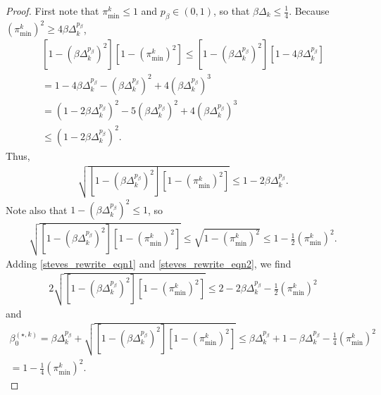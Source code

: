 \documentclass{article}
\theoremstyle{case}
\numberwithin{theorem}{subsection}
\newcommand{\bsk}{{\beta_0^{(\star, k)}}}
\newcommand{\dk}{\Delta_k}
\newcommand{\thetamink}{{\pi^k_{\textrm{min}}}}
\begin{document}
\begin{proof}


First note that $\thetamink \le 1$ and $p_{\beta} \in (0, 1)$, so that $\beta \dk \le \frac 1 4$.
Because $\left(\thetamink\right)^2 \ge 4\beta\dk^{p_{\beta}}$,
\begin{align*}
    \left[1 - \left(\beta \dk ^{p_{\beta}}\right)^2\right]\left[1 - \left(\thetamink \right)^2\right]
\le \left[1 - \left(\beta \dk ^{p_{\beta}}\right)^2\right]\left[1 - 4\beta \dk^{p_{\beta}}\right] \\
= 1 - 4 \beta \dk^{p_{\beta}} - \left(\beta \dk^{p_{\beta}}\right)^2 + 4 \left(\beta \dk^{p_{\beta}}\right)^3 \\
= \left(1 - 2 \beta \dk^{p_{\beta}}\right)^2 - 5 \left(\beta\dk^{p_{\beta}}\right)^2 + 4 \left(\beta \dk^{p_{\beta}}\right)^3 \\
\le \left(1 - 2\beta\dk^{p_{\beta}}\right)^2.
\end{align*}
Thus, 
\begin{align}
\label{steves_rewrite_eqn1}
\sqrt{\left[1 - \left(\beta \dk ^{p_{\beta}}\right)^2\right]\left[1 - \left(\thetamink \right)^2\right]} 
\le 1 - 2 \beta \dk^{p_{\beta}}.
\end{align}
Note also that $1 - \left(\beta  \dk ^{p_{\beta}}\right)^2 \le 1$, so
\begin{align}
\label{steves_rewrite_eqn2}
\sqrt{\left[1 - \left(\beta \dk ^{p_{\beta}}\right)^2\right]\left[1 - \left(\thetamink \right)^2\right]} 
\le \sqrt{1 - \left(\thetamink \right)^2} \le 1 - \frac 1 2 \left(\thetamink \right)^2.
\end{align}
Adding \cref{steves_rewrite_eqn1} and \cref{steves_rewrite_eqn2}, we find
\begin{align*}
2 \sqrt{\left[1 - \left(\beta \dk ^{p_{\beta}}\right)^2\right]\left[1 - \left(\thetamink \right)^2\right]} 
\le 2 - 2 \beta \dk ^{p_{\beta}} - \frac 1 2 \left(\thetamink \right)^2
\end{align*}
and
\begin{align*}
\bsk = \beta \dk ^{p_{\beta}} + \sqrt{\left[1 - \left(\beta \dk ^{p_{\beta}}\right)^2\right]\left[1 - \left(\thetamink \right)^2\right]}
\le \beta \dk ^{p_{\beta}} + 1 - \beta \dk ^{p_{\beta}} - \frac 1 4 \left(\thetamink \right)^2 \\
= 1 - \frac 1 4 \left(\thetamink \right)^2.
\end{align*}
\end{proof}
\end{document}
